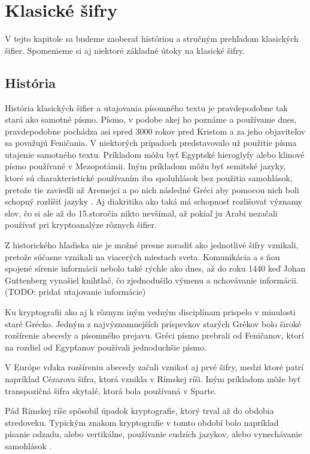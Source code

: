 \section{Klasické šifry}
V tejto kapitole sa budeme zaoberať históriou a stručným prehľadom klasických šifier.
Spomenieme si aj niektoré základné útoky na klasické šifry. 

\subsection{História}
História klasických šifier a utajovania písomného textu je pravdepodobne tak stará ako samotné písmo.
Písmo, v podobe akej ho poznáme a používame dnes, pravdepodobne pochádza asi spred 3000 rokov pred Kristom a za jeho objaviteľov sa považujú
Feničania.
V niektorých prípadoch predstavovalo už použitie písma utajenie samotného textu.
Príkladom môžu byť Egyptské hieroglyfy alebo klinové písmo používané v Mezopotámii.
Iným príkladom môžu byť semitské jazyky, ktoré sú charakteristické používaním iba spoluhlások bez použitia samohlások,
pretože tie zaviedli až Aremejci a po nich následné Gréci aby pomocou nich boli schopný rozlíšiť jazyky \cite{ks}.
Aj diakritika ako taká má schopnosť rozlišovať významy slov, čo si ale až do 15.storočia nikto nevšímal,
až pokiaľ ju Arabi nezačali používať pri kryptoanalýze rôznych šifier.

Z historického hľadiska nie je možné presne zoradiť ako jednotlivé šifry vznikali, pretože súčasne vznikali na viacerých miestach sveta.
Komunikácia a s ňou spojené sírenie informácii nebolo také rýchle ako dnes, až do roku 1440 keď Johan Guttenberg vynašiel kníhtlač,
čo zjednodušilo výmenu a uchovávanie informácii. (TODO: pridať utajovanie informácie)

Ku kryptografii ako aj k rôznym iným vedným disciplínam prispelo v minulosti staré Grécko.
Jedným z najvýznamnejších príspevkov starých Grékov bolo široké rozšírenie abecedy a písomného prejavu.
Gréci písmo prebrali od Feničanov, ktorí na rozdiel od Egypťanov používali jednoduchšie písmo.

V Európe vďaka rozšíreniu abecedy začali vznikať aj prvé šifry, medzi ktoré patrí napríklad Cézarova šifra, ktorá vznikla v Rímskej ríši.
Iným príkladom môže byť transpozičná šifra skytalé, ktorá bola používaná v Sparte.

Pád Rímskej ríše spôsobil úpadok kryptografie, ktorý trval až do obdobia stredoveku. Typickým znakom kryptografie v tomto období bolo
napríklad písanie odzadu, alebo vertikálne, používanie cudzích jazykov, alebo vynechávanie samohlások \cite{ks}.

